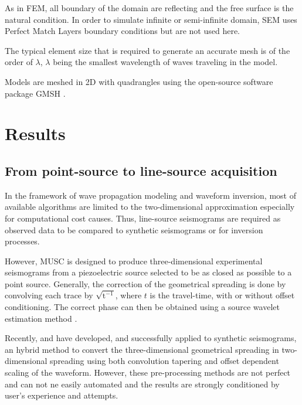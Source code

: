 \documentclass[manuscript,revised]{geophysics}
\newcommand{\twod}{two-dimensional }
\newcommand{\thrd}{three-dimensional }
\begin{document}
\noindent As in FEM, all boundary of the domain are reflecting and the free surface is the natural condition.  In order to simulate infinite or semi-infinite domain, SEM uses Perfect Match Layers boundary conditions \citep{Berenger_PML_1994,Festa_PML_2005} but are not used here.
 
\noindent The typical element size that is required to generate an accurate mesh is of the order of $\lambda$, $\lambda$ being the smallest wavelength of waves traveling in the model.

\noindent Models are meshed in 2D with quadrangles using the open-source software package GMSH \citep{Geuzaine_MSH_2009}. 

\section{Results}

\subsection{From point-source to line-source acquisition}

\noindent In the framework of wave propagation modeling and waveform inversion, most of available algorithms are limited to the \twod approximation especially for computational cost causes. Thus, line-source seismograms are required as observed data to be compared to synthetic seismograms or for inversion processes.

\noindent However, MUSC is designed to produce \thrd experimental seismograms from a piezoelectric source selected to be as closed as possible to a point source. Generally, the correction of the geometrical spreading is done by convolving each trace by $\mathrm{\sqrt{t^{-1}}}$, where $t$ is the travel-time, with or without offset conditioning. The correct phase can then be obtained using a source wavelet estimation method \citep{Bretaudeau_SSM_2011}.

\noindent Recently, \citet{Forbriger_LSS_2014} and \citet{Schafer_LSS_2014} have developed, and successfully applied to synthetic seismograms, an hybrid method to convert the \thrd geometrical spreading in \twod spreading using both convolution tapering and offset dependent scaling of the waveform. However, these pre-processing methods are not perfect and can not ne easily automated and the results are strongly conditioned by user's experience and attempts.
\end{document}
